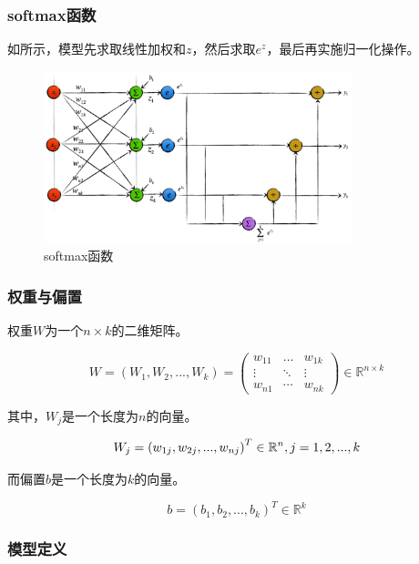 \begin{content}
\subsubsection{softmax函数}

如所示，模型先求取线性加权和$z$，然后求取$e^z$，最后再实施归一化操作。

\begin{figure}[H]
\centering
\includegraphics[width=0.8\textwidth]{figures/softmax.png}
\caption{softmax函数}
 \label{fig:softmax}
\end{figure}

\subsubsection{权重与偏置}

权重$W$为一个$n \times k$的二维矩阵。

\[
W = \left( {{W_1},{W_2},...,{W_k}} \right) = \left( {\begin{array}{*{20}{c}}
  {{w_{11}}}& \ldots &{{w_{1k}}} \\ 
   \vdots & \ddots & \vdots  \\ 
  {{w_{n1}}}& \cdots &{{w_{nk}}} 
\end{array}} \right) \in {\mathbb{R}^{n \times k}}
\]

其中，$W_j$是一个长度为$n$的向量。

\[
{W_j} = {\left( {{w_{1j}},{w_{2j}},...,{w_{nj}}} \right)^T} \in {\mathbb{R}^n}, j = 1,2,...,k \\
\]

而偏置$b$是一个长度为$k$的向量。

\[
b = {({b_1},{b_2},...,{b_k})^T} \in {\mathbb{R}^k}
\]

\subsubsection{模型定义}


\end{content}
